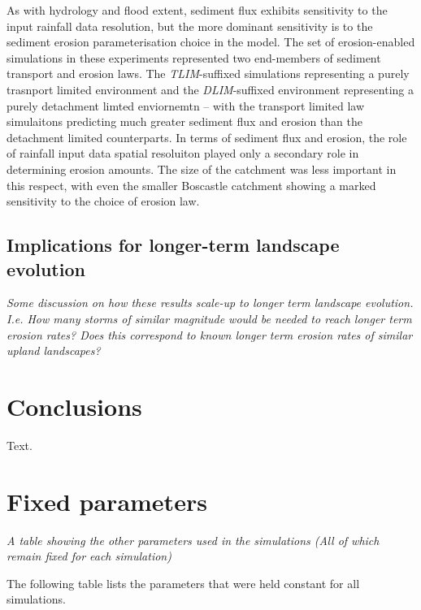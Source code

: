 As with hydrology and flood extent, sediment flux exhibits sensitivity to the input rainfall data resolution, but the more dominant sensitivity is to the sediment erosion parameterisation choice in the model. The set of erosion-enabled simulations in these experiments represented two end-members of sediment transport and erosion laws. The \textit{TLIM}-suffixed simulations representing a purely trasnport limited environment and the \textit{DLIM}-suffixed environment representing a purely detachment limted enviornemtn -- with the transport limited law simulaitons predicting much greater sediment flux and erosion than the detachment limited counterparts. In terms of sediment flux and erosion, the role of rainfall input data spatial resoluiton played only a secondary role in determining erosion amounts. The size of the catchment was less important in this respect, with even the smaller Boscastle catchment showing a marked sensitivity to the choice of erosion law.

\subsection{Implications for longer-term landscape evolution}
\textit{Some discussion on how these results scale-up to longer term landscape evolution. I.e. How many storms of similar magnitude would be needed to reach longer term erosion rates? Does this correspond to known longer term erosion rates of similar upland landscapes?}

\section{Conclusions}  %
Text.



\section{Fixed parameters}

\textit{A table showing the other parameters used in the simulations (All of which remain fixed for each simulation)}

The following table lists the parameters that were held constant for all simulations.
